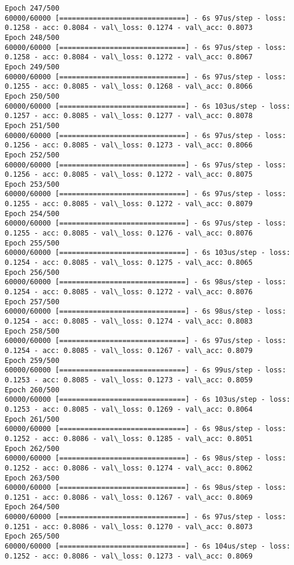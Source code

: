 \documentclass[11pt]{article}
\begin{document}
\begin{Verbatim}[commandchars=\\\{\}]
Epoch 247/500
60000/60000 [==============================] - 6s 97us/step - loss: 0.1258 - acc: 0.8084 - val\_loss: 0.1274 - val\_acc: 0.8073
Epoch 248/500
60000/60000 [==============================] - 6s 97us/step - loss: 0.1258 - acc: 0.8084 - val\_loss: 0.1272 - val\_acc: 0.8067
Epoch 249/500
60000/60000 [==============================] - 6s 97us/step - loss: 0.1255 - acc: 0.8085 - val\_loss: 0.1268 - val\_acc: 0.8066
Epoch 250/500
60000/60000 [==============================] - 6s 103us/step - loss: 0.1257 - acc: 0.8085 - val\_loss: 0.1277 - val\_acc: 0.8078
Epoch 251/500
60000/60000 [==============================] - 6s 97us/step - loss: 0.1256 - acc: 0.8085 - val\_loss: 0.1273 - val\_acc: 0.8066
Epoch 252/500
60000/60000 [==============================] - 6s 97us/step - loss: 0.1256 - acc: 0.8085 - val\_loss: 0.1272 - val\_acc: 0.8075
Epoch 253/500
60000/60000 [==============================] - 6s 97us/step - loss: 0.1255 - acc: 0.8085 - val\_loss: 0.1272 - val\_acc: 0.8079
Epoch 254/500
60000/60000 [==============================] - 6s 97us/step - loss: 0.1255 - acc: 0.8085 - val\_loss: 0.1276 - val\_acc: 0.8076
Epoch 255/500
60000/60000 [==============================] - 6s 103us/step - loss: 0.1254 - acc: 0.8085 - val\_loss: 0.1275 - val\_acc: 0.8065
Epoch 256/500
60000/60000 [==============================] - 6s 98us/step - loss: 0.1254 - acc: 0.8085 - val\_loss: 0.1272 - val\_acc: 0.8076
Epoch 257/500
60000/60000 [==============================] - 6s 98us/step - loss: 0.1254 - acc: 0.8085 - val\_loss: 0.1274 - val\_acc: 0.8083
Epoch 258/500
60000/60000 [==============================] - 6s 97us/step - loss: 0.1254 - acc: 0.8085 - val\_loss: 0.1267 - val\_acc: 0.8079
Epoch 259/500
60000/60000 [==============================] - 6s 99us/step - loss: 0.1253 - acc: 0.8085 - val\_loss: 0.1273 - val\_acc: 0.8059
Epoch 260/500
60000/60000 [==============================] - 6s 103us/step - loss: 0.1253 - acc: 0.8085 - val\_loss: 0.1269 - val\_acc: 0.8064
Epoch 261/500
60000/60000 [==============================] - 6s 98us/step - loss: 0.1252 - acc: 0.8086 - val\_loss: 0.1285 - val\_acc: 0.8051
Epoch 262/500
60000/60000 [==============================] - 6s 98us/step - loss: 0.1252 - acc: 0.8086 - val\_loss: 0.1274 - val\_acc: 0.8062
Epoch 263/500
60000/60000 [==============================] - 6s 98us/step - loss: 0.1251 - acc: 0.8086 - val\_loss: 0.1267 - val\_acc: 0.8069
Epoch 264/500
60000/60000 [==============================] - 6s 97us/step - loss: 0.1251 - acc: 0.8086 - val\_loss: 0.1270 - val\_acc: 0.8073
Epoch 265/500
60000/60000 [==============================] - 6s 104us/step - loss: 0.1252 - acc: 0.8086 - val\_loss: 0.1273 - val\_acc: 0.8069

\end{Verbatim}
\end{document}
